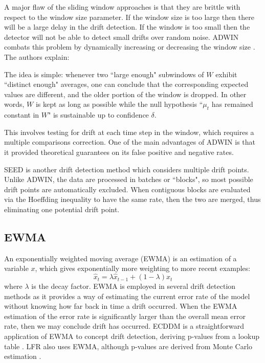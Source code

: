 A major flaw of the sliding window approaches is that they are brittle with respect to the window size parameter. If the window size is too large then there will be a large delay in the drift detection. If the window is too small then the detector will not be able to detect small drifts over random noise. ADWIN combats this problem by dynamically increasing or decreasing the window size \cite{ADWIN}. The authors explain:
\begin{displayquote}
    The idea is simple: whenever two ``large enough" subwindows of $W$ exhibit ``distinct enough" averages, one can conclude that the corresponding expected values are different, and the older portion of the window is dropped. In other words, $W$ is kept as long as possible while the null hypothesis ``$\mu_t$ has remained constant in $W$" is sustainable up to confidence $\delta$.
\end{displayquote}
This involves testing for drift at each time step in the window, which requires a multiple comparisons correction. One of the main advantages of ADWIN is that it provided theoretical guarantees on its false positive and negative rates.

SEED \cite{SEED} is another drift detection method which considers multiple drift points. Unlike ADWIN, the data are processed in batches or ``blocks", so most possible drift points are automatically excluded. When contiguous blocks are evaluated via the Hoeffding inequality to have the same rate, then the two are merged, thus eliminating one potential drift point.

\subsection{EWMA}

An exponentially weighted moving average (EWMA) \cite{EWMA} is an estimation of a variable $x$, which gives exponentially more weighting to more recent examples:
\begin{equation}
  \hat{x}_t = \lambda \hat{x}_{t-1} + (1-\lambda) x_t
\end{equation}
where $\lambda$ is the decay factor. EWMA is employed in several drift detection methods as it provides a way of estimating the current error rate of the model without knowing how far back in time a drift occurred. When the EWMA estimation of the error rate is significantly larger than the overall mean error rate, then we may conclude drift has occurred. ECDDM is a straightforward application of EWMA to concept drift detection, deriving p-values from a lookup table \cite{ECDDM}. LFR also uses EWMA, although p-values are derived from Monte Carlo estimation \cite{LFR}.

